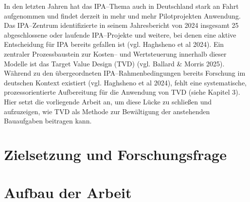 In den letzten Jahren hat das IPA--Thema auch in Deutschland stark an Fahrt aufgenommen und findet derzeit in mehr und mehr Pilotprojekten Anwendung. Das IPA--Zentrum identifizierte in seinem Jahresbericht von 2024 insgesamt 25 abgeschlossene oder laufende IPA--Projekte und weitere, bei denen eine aktive Entscheidung für IPA bereits gefallen ist (vgl. Haghsheno et al 2024). Ein zentraler Prozessbaustein zur Kosten-- und Wertsteuerung innerhalb dieser Modelle ist das Target Value Design (TVD) (vgl. Ballard \& Morris 2025). Während zu den übergeordneten IPA--Rahmenbedingungen bereits Forschung im deutschen Kontext existiert (vgl. Haghsheno et al 2024), fehlt eine systematische, prozessorientierte  Aufbereitung für die Anwendung von TVD (siehe Kapitel 3). Hier setzt die vorliegende  Arbeit an, um diese Lücke zu schließen und aufzuzeigen, wie TVD als Methode zur Bewältigung der anstehenden Bauaufgaben beitragen kann.

\section{Zielsetzung und Forschungsfrage}
\label{sec:zielsetzung}

\section{Aufbau der Arbeit}
\label{sec:aufbau}
